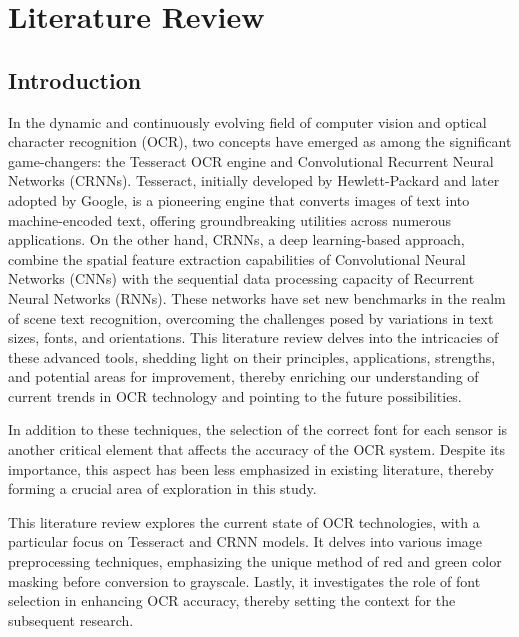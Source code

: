 \chapter{Literature Review}
\label{chap:litreview}

\section{Introduction}

In the dynamic and continuously evolving field of computer vision and optical character recognition (OCR), two concepts have emerged as among the significant game-changers: the Tesseract OCR engine and Convolutional Recurrent Neural Networks (CRNNs). Tesseract, initially developed by Hewlett-Packard and later adopted by Google, is a pioneering engine that converts images of text into machine-encoded text, offering groundbreaking utilities across numerous applications. On the other hand, CRNNs, a deep learning-based approach, combine the spatial feature extraction capabilities of Convolutional Neural Networks (CNNs) with the sequential data processing capacity of Recurrent Neural Networks (RNNs). These networks have set new benchmarks in the realm of scene text recognition, overcoming the challenges posed by variations in text sizes, fonts, and orientations. This literature review delves into the intricacies of these advanced tools, shedding light on their principles, applications, strengths, and potential areas for improvement, thereby enriching our understanding of current trends in OCR technology and pointing to the future possibilities.


In addition to these techniques, the selection of the correct font for each sensor is another critical element that affects the accuracy of the OCR system. Despite its importance, this aspect has been less emphasized in existing literature, thereby forming a crucial area of exploration in this study.

This literature review explores the current state of OCR technologies, with a particular focus on Tesseract and CRNN models. It delves into various image preprocessing techniques, emphasizing the unique method of red and green color masking before conversion to grayscale. Lastly, it investigates the role of font selection in enhancing OCR accuracy, thereby setting the context for the subsequent research.

